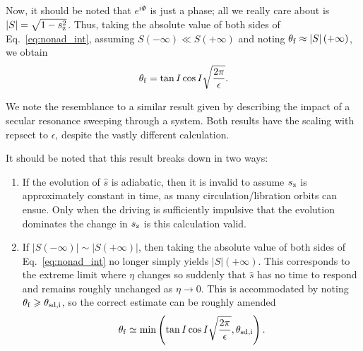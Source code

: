 \documentclass[
        fleqn,
        usenatbib,
        referee,
    ]{mnras}
\newcommand*{\abs}[1]{\left|#1\right|}
\newcommand*{\p}[1]{\left(#1\right)}
\begin{document}
Now, it should be noted that $e^{i\Phi}$ is just a phase; all we really care
about is $\abs{S} = \sqrt{1 - s_{\rm z}^2}$. Thus, taking the absolute value of both
sides of Eq.~\eqref{eq:nonad_int}, assuming $S\p{-\infty} \ll S\p{+\infty}$ and
noting $\theta_{\rm f} \approx \abs{S}(+\infty)$, we obtain
\begin{equation}
    \theta_{\rm f} = \tan I\cos I\sqrt{\frac{2\pi}{\epsilon}}.
        \label{eq:nonad_dong}
\end{equation}

We note the resemblance to a similar result given by \citet{malhotra_calc}
describing the impact of a secular resonance sweeping through a system. Both
results have the scaling with repsect to $\epsilon$, despite the vastly
different calculation.

It should be noted that this result breaks down in two ways:
\begin{enumerate}
    \item If the evolution of $\hat{s}$ is adiabatic, then it is invalid to
        assume $s_{\rm z}$ is approximately constant in time, as many
        circulation/libration orbits can ensue. Only when the driving is
        sufficiently impulsive that the evolution dominates the change in
        $s_{\rm z}$
        is this calculation valid.

    \item If $\abs{S\p{-\infty}} \sim \abs{S\p{+\infty}}$, then taking the
        absolute value of both sides of Eq.~\eqref{eq:nonad_int} no longer
        simply yields $\abs{S}\p{+\infty}$. This corresponds to the extreme
        limit where $\eta$ changes so suddenly that $\hat{s}$ has no time to
        respond and remains roughly unchanged as $\eta \to 0$. This is
        accommodated by noting $\theta_{\rm f} \geq \theta_{\rm sd, i}$, so the
        correct estimate can be roughly amended
        \begin{equation}
            \theta_{\rm f} \simeq \min\p{\tan I\cos
                I\sqrt{\frac{2\pi}{\epsilon}}, \theta_{\rm sd, i}}.
        \end{equation}
\end{enumerate}

\bsp
\label{lastpage} %
\end{document}
